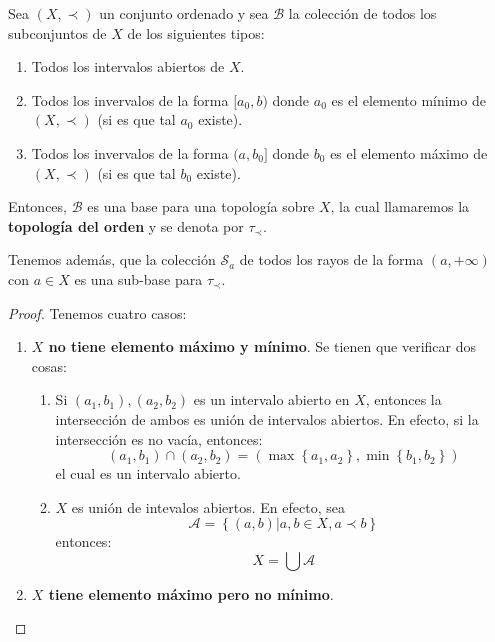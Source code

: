 \documentclass[12pt]{report}
\theoremstyle{largebreak}
\begin{document}
    \begin{propo}
        Sea $(X,\prec)$ un conjunto ordenado y sea $\mathcal{B}$ la colección de todos los subconjuntos de $X$ de los siguientes tipos:
        \begin{enumerate}
            \item Todos los intervalos abiertos de $X$.
            \item Todos los invervalos de la forma $[a_0,b)$ donde $a_0$ es el elemento mínimo de $(X,\prec)$ (si es que tal $a_0$ existe).
            \item Todos los invervalos de la forma $(a,b_0]$ donde $b_0$ es el elemento máximo de $(X,\prec)$ (si es que tal $b_0$ existe).
        \end{enumerate}
        Entonces, $\mathcal{B}$ es una base para una topología sobre $X$, la cual llamaremos la \textbf{topología del orden} y se denota por $\tau_\prec$.

        Tenemos además, que la colección $\mathcal{S}_a$ de todos los rayos de la forma $(a,+\infty)$ con $a\in X$ es una sub-base para $\tau_\prec$.
    \end{propo}
    
    \begin{proof}
        Tenemos cuatro casos:
        \begin{enumerate}
            \item \textbf{$X$ no tiene elemento máximo y mínimo}. Se tienen que verificar dos cosas:
            \begin{enumerate}
                \item Si $(a_1,b_1),(a_2,b_2)$ es un intervalo abierto en $X$, entonces la intersección de ambos es unión de intervalos abiertos. En efecto, si la intersección es no vacía, entonces:
                \begin{equation*}
                    (a_1,b_1)\cap(a_2,b_2)=(\max\left\{a_1,a_2\right\},\min\left\{b_1,b_2\right\})
                \end{equation*}
                el cual es un intervalo abierto. 
                \item $X$ es unión de intevalos abiertos. En efecto, sea
                \begin{equation*}
                    \mathcal{A}=\left\{(a,b)\Big|a,b\in X, a\prec b \right\}
                \end{equation*}
                entonces:
                \begin{equation*}
                    X=\bigcup\mathcal{A}
                \end{equation*}
            \end{enumerate}
            \item \textbf{$X$ tiene elemento máximo pero no mínimo}.
        \end{enumerate}
    \end{proof}
\end{document}
